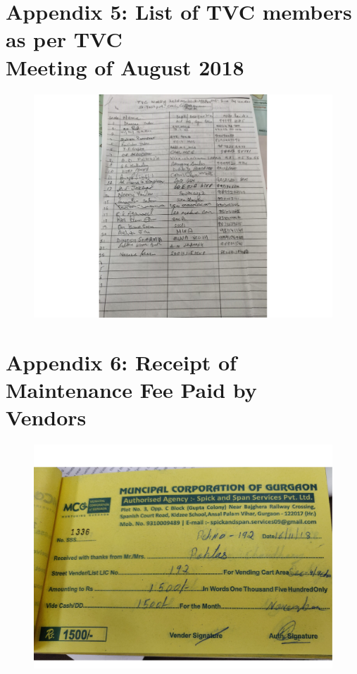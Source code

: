 \documentclass[a4paper, 12pt, twoside]{article}
\begin{document}
{{\section*{Appendix 5: List of TVC members as per TVC \\Meeting of August 2018}
\begin{figure}[h]
\centering
\includegraphics[width=7in]{ListofTVC.pdf}
\end{figure}

\newpage
\section*{Appendix 6: Receipt of Maintenance Fee Paid by \\Vendors}
\begin{figure}[h]
\centering
\includegraphics[width=6in]{Receipt1.pdf}
\end{figure}

}}
\end{document}

